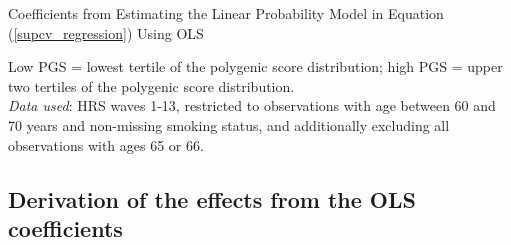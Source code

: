\captionsetup{width = 11cm}
\begin{table}[ht] \centering
	\caption{Coefficients from Estimating the Linear Probability Model in Equation (\ref{supcv_regression}) Using OLS}
	\label{suptab:cv_regression}
	
		\begin{flushleft}
			Low PGS = lowest tertile of the polygenic score distribution; high PGS = upper two tertiles of the polygenic score distribution.\\
			 \textit{Data used}: HRS waves 1-13, restricted to observations with age between 60 and 70 years and non-missing smoking status, and additionally excluding all observations with ages 65 or 66.
			\vspace{5mm}
		\end{flushleft}
\end{table}
\captionsetup{width = \columnwidth}


\pagebreak

\subsection{Derivation of the effects from the OLS coefficients}
\label{appsec:derivation}
